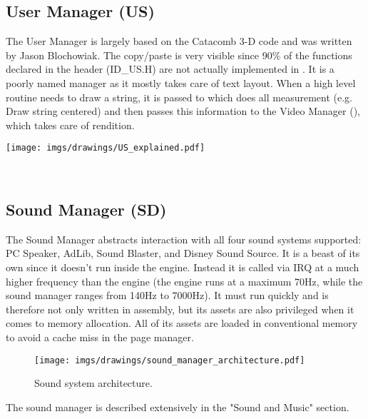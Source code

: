 \documentclass[book.tex]{subfiles}
\begin{document}
\subsection{User Manager (US)}
\begin{minipage}{0.7\textwidth}
The User Manager is largely based on the Catacomb 3-D code and was written by Jason Blochowiak. The copy/paste is very visible since 90\% of the functions declared in the header (ID\_US.H) are not actually implemented in . 
It is a poorly named manager as it mostly takes care of text layout. When a  high level routine needs to draw a string, it is passed to  which does all measurement (e.g. Draw string centered)
and then passes this information to the Video Manager (), which takes care of rendition.
\end{minipage}
\begin{minipage}{0.3\textwidth}
\begin{flushright}
\texttt{[image: imgs/drawings/US\_explained.pdf]}
\end{flushright}
\end{minipage}
\noindent
\\












\subsection{Sound Manager (SD)}
The Sound Manager abstracts interaction with all four sound systems supported: PC Speaker, AdLib, Sound Blaster, and Disney Sound Source. It is a beast of its own since it doesn't run inside the engine. Instead it is called via IRQ at a much higher frequency than the engine (the engine runs at a maximum 70Hz, while the sound manager ranges from 140Hz to 7000Hz). It must run quickly and is therefore not only written in assembly, but its assets are also privileged when it comes to memory allocation. All of its assets are loaded in conventional memory to avoid a cache miss in the page manager.\\
 \par
\begin{figure}[H]
\centering
 \texttt{[image: imgs/drawings/sound\_manager\_architecture.pdf]}
 \caption{Sound system architecture.}
 \end{figure}
 \par
The sound manager is described extensively in the "Sound and Music" section.
\end{document}
